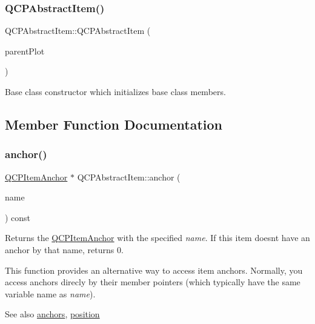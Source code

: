 \subsubsection{\texorpdfstring{Q\+C\+P\+Abstract\+Item()}{QCPAbstractItem()}}
{\footnotesize\ttfamily Q\+C\+P\+Abstract\+Item\+::\+Q\+C\+P\+Abstract\+Item (\begin{DoxyParamCaption}\item[{\hyperlink{classQCustomPlot}{Q\+Custom\+Plot} $\ast$}]{parent\+Plot }\end{DoxyParamCaption})\hspace{0.3cm}{\ttfamily [explicit]}}

Base class constructor which initializes base class members. 

\subsection{Member Function Documentation}
\mbox{\label{classQCPAbstractItem_a139c255ea8831642fac91748e29a5adb}} 
\subsubsection{\texorpdfstring{anchor()}{anchor()}}
{\footnotesize\ttfamily \hyperlink{classQCPItemAnchor}{Q\+C\+P\+Item\+Anchor} $\ast$ Q\+C\+P\+Abstract\+Item\+::anchor (\begin{DoxyParamCaption}\item[{const Q\+String \&}]{name }\end{DoxyParamCaption}) const}

Returns the \hyperlink{classQCPItemAnchor}{Q\+C\+P\+Item\+Anchor} with the specified {\itshape name}. If this item doesn\textquotesingle{}t have an anchor by that name, returns 0.

This function provides an alternative way to access item anchors. Normally, you access anchors direcly by their member pointers (which typically have the same variable name as {\itshape name}).

\begin{DoxySeeAlso}{See also}
\hyperlink{classQCPAbstractItem_a81d1ecfea3368b836cf9675a0045e659}{anchors}, \hyperlink{classQCPAbstractItem_a2589c3d298f9a576d77d9addb440a18d}{position} 
\end{DoxySeeAlso}
\mbox{\label{classQCPAbstractItem_a81d1ecfea3368b836cf9675a0045e659}} 

